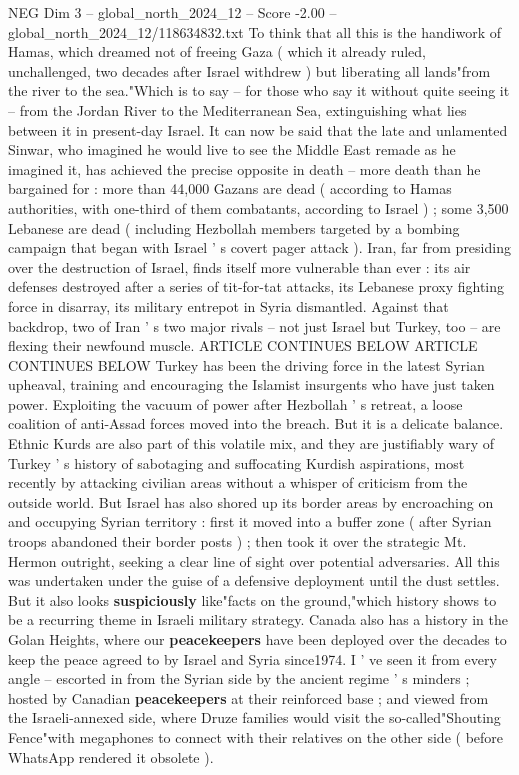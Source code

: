 \begin{textsample}{NEG Dim 3 – global\_north\_2024\_12 – Score -2.00 – global\_north\_2024\_12/118634832.txt}
To think that all this is the handiwork of Hamas, which dreamed not of freeing Gaza ( which it already ruled, unchallenged, two decades after Israel withdrew ) but liberating all lands"from the river to the sea."Which is to say -- for those who say it without quite seeing it -- from the Jordan River to the Mediterranean Sea, extinguishing what lies between it in present-day Israel.
It can now be said that the late and unlamented Sinwar, who imagined he would live to see the Middle East remade as he imagined it, has achieved the precise opposite in death -- more death than he bargained for : more than 44,000 Gazans are dead ( according to Hamas authorities, with one-third of them combatants, according to Israel ) ; some 3,500 Lebanese are dead ( including Hezbollah members targeted by a bombing campaign that began with Israel ' s covert pager attack ).
Iran, far from presiding over the destruction of Israel, finds itself more vulnerable than ever : its air defenses destroyed after a series of tit-for-tat attacks, its Lebanese proxy fighting force in disarray, its military entrepot in Syria dismantled.
Against that backdrop, two of Iran ' s two major rivals -- not just Israel but Turkey, too -- are flexing their newfound muscle.
ARTICLE CONTINUES BELOW ARTICLE CONTINUES BELOW Turkey has been the driving force in the latest Syrian upheaval, training and encouraging the Islamist insurgents who have just taken power.
Exploiting the vacuum of power after Hezbollah ' s retreat, a loose coalition of anti-Assad forces moved into the breach.
But it is a delicate balance.
Ethnic Kurds are also part of this volatile mix, and they are justifiably wary of Turkey ' s history of sabotaging and suffocating Kurdish aspirations, most recently by attacking civilian areas without a whisper of criticism from the outside world.
But Israel has also shored up its border areas by encroaching on and occupying Syrian territory : first it moved into a buffer zone ( after Syrian troops abandoned their border posts ) ; then took it over the strategic Mt.
Hermon outright, seeking a clear line of sight over potential adversaries.
All this was undertaken under the guise of a defensive deployment until the dust settles.
But it also looks \textbf{suspiciously} like"facts on the ground,"which history shows to be a recurring theme in Israeli military strategy.
Canada also has a history in the Golan Heights, where our \textbf{peacekeepers} have been deployed over the decades to keep the peace agreed to by Israel and Syria since1974.
I ' ve seen it from every angle -- escorted in from the Syrian side by the ancient regime ' s minders ; hosted by Canadian \textbf{peacekeepers} at their reinforced base ; and viewed from the Israeli-annexed side, where Druze families would visit the so-called"Shouting Fence"with megaphones to connect with their relatives on the other side ( before WhatsApp rendered it obsolete ).

\end{textsample}
